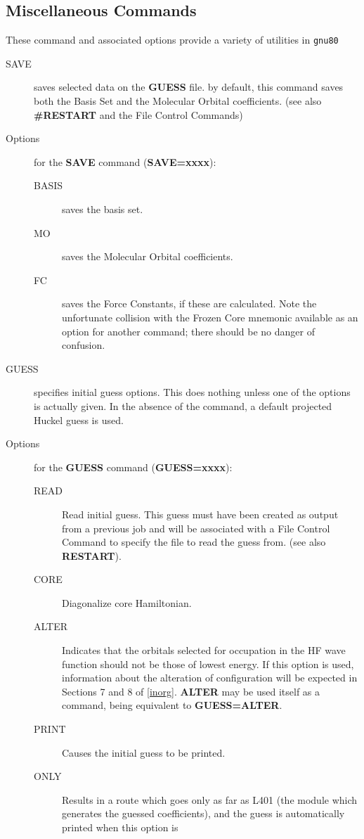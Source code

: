 \subsection{\sf Miscellaneous Commands}
These command and associated options provide
a variety of utilities in {\tt gnu80}
\begin{description}
\item[SAVE]    saves selected data on the {\bf GUESS} file. by default, this
command saves both the Basis Set and the Molecular Orbital
coefficients. (see also {\bf\#RESTART} and the File Control Commands)
\item[Options] for the {\bf SAVE} command ({\bf SAVE=xxxx}):
\begin{description}
\item[BASIS] saves the basis set.
\item[MO] saves the Molecular Orbital coefficients.
\item[FC] saves the Force Constants, if these are
calculated. Note the unfortunate collision with the Frozen Core
mnemonic available as an option for another command; there should
be no danger of confusion.
\end{description}
\item[GUESS]   specifies initial guess options.  This does nothing unless one
of the options is actually given. In the absence of the command, a default
projected Huckel guess is used. 
\item[Options] for the {\bf GUESS} command ({\bf GUESS=xxxx}):
\begin{description}
\item[READ] Read initial guess. This guess must have been 
created as output from a
previous job and will be associated with a File Control
Command to specify the file to read the guess from. (see also {\bf RESTART}).
\item[CORE] Diagonalize core Hamiltonian.
\item[ALTER] Indicates that the orbitals selected for occupation in
the HF wave function should not be those of lowest energy. If
this option is used, information about the alteration of
configuration will be expected in Sections 7 and 8 of \ref{inorg}.
{\bf ALTER} may
be used itself as a command, being equivalent to {\bf GUESS=ALTER}.
\item[PRINT] Causes the initial guess to be printed.
\item[ONLY] Results in a route which goes only as far as 
L401 (the module which generates the guessed coefficients), and
the guess is automatically printed when this option is

\end{description}
\end{description}
